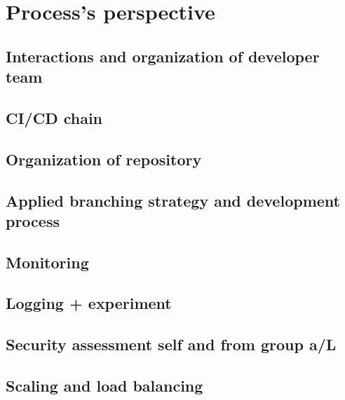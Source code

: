 \section{Process's perspective} \label{section:Process perspective}
\subsection{Interactions and organization of developer team}
\subsection{CI/CD chain}
\subsection{Organization of repository}
\subsection{Applied branching strategy and development process}
\subsection{Monitoring} %
\subsection{Logging + experiment}
\subsection{Security assessment self and from group a/L} %
\subsection{Scaling and load balancing}
